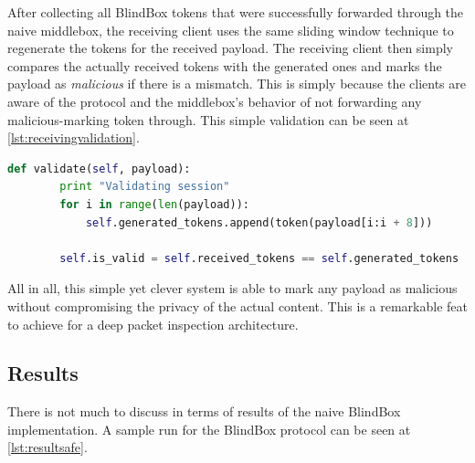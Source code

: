 \documentclass{winslabreport}
\begin{document}
After collecting all BlindBox tokens that were successfully forwarded through the naive middlebox, the receiving client uses the same sliding window technique to regenerate the tokens for the received payload. The receiving client then simply compares the actually received tokens with the generated ones and marks the payload as \emph{malicious} if there is a mismatch. This is simply because the clients are aware of the protocol and the middlebox's behavior of not forwarding any malicious-marking token through. This simple validation can be seen at \autoref{lst:receivingvalidation}.

\begin{lstlisting}[caption={Validating Tokens},label={lst:receivingvalidation},language=Python]
    def validate(self, payload):
        print "Validating session"
        for i in range(len(payload)):
            self.generated_tokens.append(token(payload[i:i + 8]))

        self.is_valid = self.received_tokens == self.generated_tokens
\end{lstlisting}

All in all, this simple yet clever system is able to mark any payload as malicious without compromising the privacy of the actual content. This is a remarkable feat to achieve for a deep packet inspection architecture.

\subsection{Results}

There is not much to discuss in terms of results of the naive BlindBox implementation. A sample run for the BlindBox protocol can be seen at \autoref{lst:resultsafe}.
\end{document}
